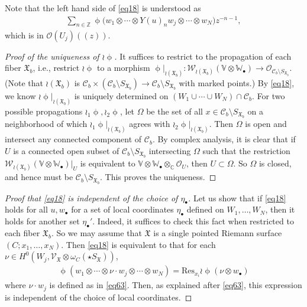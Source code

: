 \documentclass[12pt,a4paper,notitlepage]{article}
\theoremstyle{definition}
\theoremstyle{plain}
\newcommand{\fk}{\mathfrak}
\newcommand{\mc}{\mathcal}
\newcommand{\Res}{\mathrm{Res}}
\newcommand{\scr}{\mathscr}
\newcommand{\SX}{{S_{\fk X}}}
\newcommand{\blt}{\bullet}
\newcommand{\Vbb}{\mathbb V}
\newcommand{\Wbb}{\mathbb W}
\newcommand{\Cbb}{\mathbb C}
\newcommand{\Zbb}{\mathbb Z}
\newcommand{\SXb}{{S_{\fk X_b}}}
\numberwithin{equation}{section}
\begin{document}
Note that the left hand side of \eqref{eq18} is understood as
\begin{align*}
\sum_{n\in\Zbb} \upphi\big(w_1\otimes\cdots\otimes Y(u)_nw_j\otimes\cdots\otimes w_N\big)z^{-n-1},
\end{align*}
which is in $\scr O(U_j)((z))$. 

\begin{proof}[Proof of the uniqueness of $\wr\upphi$]
It suffices to restrict to the propagation of each fiber $\fk X_b$, i.e., restrict $\wr\upphi$ to a morphism $\upphi|_{\wr(\fk X_b)}:\scr W_{\wr(\fk X_b)}(\Vbb\otimes\Wbb_\blt)\rightarrow\scr O_{\mc C_b\setminus \SXb}$.	(Note that $\wr(\fk X_b)$ is $\mc C_b\times(\mc C_b\setminus\SXb)\rightarrow\mc C_b\setminus\SXb$ with marked points.) By \eqref{eq18}, we know $\wr\upphi|_{\wr(\fk X_b)}$ is uniquely determined on $(W_1\cup\cdots\cup W_N)\cap\mc C_b$. For two possible propagations $\wr_1\upphi,\wr_2\upphi$, let $\Omega$ be the set of all $x\in\mc C_b\setminus\SXb$ on a neighborhood of which $\wr_1\upphi|_{\wr(\fk X_b)}$ agrees with $\wr_2\upphi|_{\wr(\fk X_b)}$. Then $\Omega$ is open and  intersect any connected component of $\mc C_b$. By complex analysis, it is clear that if $U$ is a connected open subset of $\mc C_b\setminus\SXb$ intersecting $\Omega$ such that the restriction $\scr W_{\wr(\fk X_b)}(\Vbb\otimes\Wbb_\blt)|_U$ is equivalent to $\Vbb\otimes\Wbb_\blt\otimes_\Cbb\scr O_U$, then $U\subset\Omega$. So $\Omega$ is closed, and hence must be $\mc C_b\setminus\SXb$. This proves the uniqueness.
\end{proof}

\begin{proof}[Proof that \eqref{eq18} is independent of the choice of $\eta_\blt$]
Let us show that if \eqref{eq18} holds for all $u,w_\blt$ for a set of local coordinates $\eta_\blt$ defined on $W_1,\dots,W_N$, then it holds for another set $\eta_\blt'$. Indeed, it suffices to check this fact when restricted to each fiber $\fk X_b$. So we may assume that $\fk X$ is a single pointed Riemann surface $(C;x_1,\dots,x_N)$. Then \eqref{eq18} is equivalent to that for each $\nu\in H^0(W_j,\scr V_{\fk X}\otimes\omega_C(\star\SX))$, 
\begin{align*}
\upphi (w_1\otimes\cdots\otimes\nu\cdot w_j\otimes\cdots\otimes w_N)=\Res_{x_i}\wr\upphi(\nu\otimes w_\blt)
\end{align*}
where $\nu\cdot w_j$ is defined as in \eqref{eq63}. Then, as explained after \eqref{eq63}, this expression is independent of the choice of local coordinates.
\end{proof}
\end{document}
